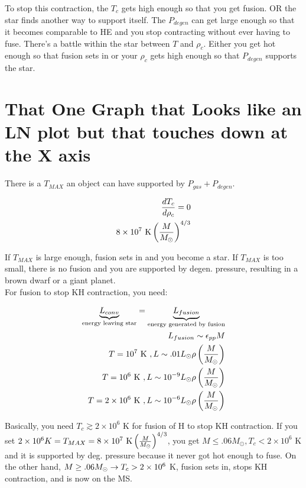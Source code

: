 To stop this contraction, the $T_c$ gets high enough so that you get fusion. OR the star finds another way to support itself. The $P_{degen}$ can get large enough so that it becomes comparable to HE and you stop contracting without ever having to fuse. There's a battle within the star between $T$ and $\rho_c$. Either you get hot enough so that fusion sets in or your $\rho_c$ gets high enough so that $P_{degen}$ supports the star.

\section{That One Graph that Looks like an LN plot but that touches down at the X axis}

There is a $T_{MAX}$ an object can have supported by $P_{gas} + P_{degen}$.

\begin{align}
\frac{dT_c}{d\rho_c} = 0\\
8 \times 10^7 \text{ K} \left( \frac{M}{M_\odot}\right)^{4/3}
\end{align}

If $T_{MAX}$ is large enough, fusion sets in and you become a star. If $T_{MAX}$ is too small, there is no fusion and you are supported by degen. pressure, resulting in a brown dwarf or a giant planet. \\

For fusion to stop KH contraction, you need:

\begin{align}
\underbrace{L_{conv}}_{\text{energy leaving star}} = \underbrace{L_{fusion}}_{\text{energy generated by fusion}}\\
L_{fusion} \sim \epsilon_{pp}M\\
T = 10^7 \text{ K}~, L \sim .01 L_\odot \rho \left( \frac{M}{M_\odot}\right)\\
T = 10^6 \text{ K}~, L \sim 10^{-9} L_\odot \rho \left( \frac{M}{M_\odot}\right)\\
T = 2 \times 10^6 \text{ K}~, L \sim 10^{-6} L_\odot \rho \left( \frac{M}{M_\odot}\right)
\end{align}

Basically, you need $T_c \gtrsim 2 \times 10^6$ K for fusion of H to stop KH contraction. If you set $2 \times 10^6 K = T_{MAX} = 8 \times10^7 \text{ K} \left( \frac{M}{M_\odot}\right)^{4/3}$, you get $M \leq .06 M_\odot, T_c < 2 \times 10^6 $ K and it is supported by deg. pressure because it never got hot enough to fuse. On the other hand, $M \geq .06 M_\odot \rightarrow T_c > 2 \times 10^6$ K, fusion sets in, stops KH contraction, and is now on the MS. \\

